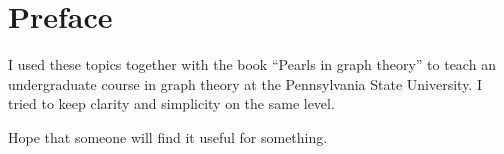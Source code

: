 \chapter*{Preface}

I used these topics together with the book ``Pearls in graph theory'' \cite{pearls} to teach an undergraduate course in graph theory at the Pennsylvania State University.
I tried to keep clarity and simplicity on the same level.

Hope that someone will find it useful for something.
